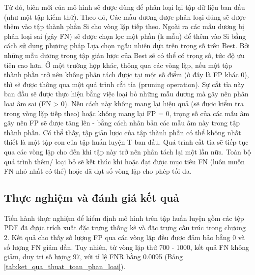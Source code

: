\documentclass[./../main.tex]{subfiles}
\begin{document}
Từ đó, biên mới của mô hình sẽ được dùng để phân loại lại tập dữ liệu ban đầu (như một tập kiểm thử). Theo đó,
Các mẫu dương được phân loại đúng sẽ được thêm vào tập thành phần Si cho vòng lặp tiếp theo.
Ngoài ra các mẫu dương bị phân loại sai (gây FN) sẽ được chọn lọc một phần (k mẫu) để thêm vào Si bằng cách sử dụng phương pháp Lựa chọn ngẫu nhiên dựa trên trọng số trên Best. Bởi những mẫu dương trong tập giản lược của Best sẽ có thể có trọng số, tức độ ưu tiên cao hơn.
Ở một trường hợp khác, thông qua các vòng lặp, nếu một tập thành phần trở nên không phân tách được tại một số điểm (ở đây là FP khác 0), thì sẽ được thông qua một quá trình cắt tỉa (pruning operation). Sự cắt tỉa này ban đầu sẽ được thực hiện bằng việc loại bỏ những mẫu dương mà gây nên phân loại âm sai (FN > 0). Nếu cách này không mang lại hiệu quả (sẽ được kiểm tra trong vòng lặp tiếp theo) hoặc không mang lại FP = 0, trọng số của các mẫu âm gây nên FP sẽ được tăng lên - bằng cách nhân bản các mẫu âm này trong tập thành phần. Có thể thấy, tập giản lược của tập thành phần có thể không nhất thiết là một tập con của tập huấn luyện T ban đầu. Quá trình cắt tỉa sẽ tiếp tục qua các vòng lặp cho đến khi tập này trở nên phân tách lại một lần nữa.
Toàn bộ quá trình thêm/ loại bỏ sẽ kết thúc khi hoặc đạt được mục tiêu FN (luôn muốn FN nhỏ nhất có thể) hoặc đã đạt số vòng lặp cho phép tối đa.


\subsection{Thực nghiệm và đánh giá kết quả}
Tiến hành thực nghiệm để kiểm định mô hình trên tập huấn luyện gồm các tệp PDF đã được trích xuất đặc trưng thống kê và đặc trưng cấu trúc trong chương 2. Kết quả cho thấy số lượng FP qua các vòng lặp đều được đảm bảo bằng 0 và số lượng FN giảm dần. Tuy nhiên, từ vòng lặp thứ 700 - 1000, kết quả FN không giảm, duy trì số lượng 97, với tỉ lệ FNR bằng 0.0095 (Bảng \ref{tab:ket_qua_thuat_toan_phan_loai}).
\end{document}
